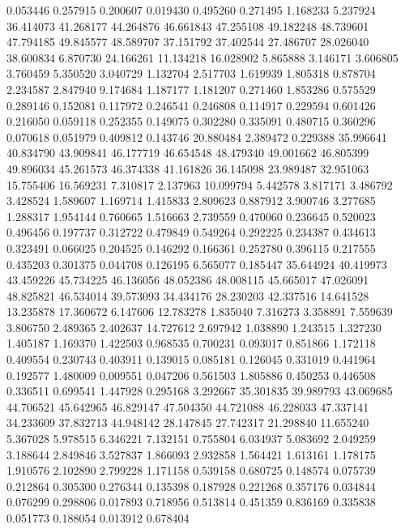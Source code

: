 0.053446
0.257915
0.200607
0.019430
0.495260
0.271495
1.168233
5.237924
36.414073
41.268177
44.264876
46.661843
47.255108
49.182248
48.739601
47.794185
49.845577
48.589707
37.151792
37.402544
27.486707
28.026040
38.600834
6.870730
24.166261
11.134218
16.028902
5.865888
3.146171
3.606805
3.760459
5.350520
3.040729
1.132704
2.517703
1.619939
1.805318
0.878704
2.234587
2.847940
9.174684
1.187177
1.181207
0.271460
1.853286
0.575529
0.289146
0.152081
0.117972
0.246541
0.246808
0.114917
0.229594
0.601426
0.216050
0.059118
0.252355
0.149075
0.302280
0.335091
0.480715
0.360296
0.070618
0.051979
0.409812
0.143746
20.880484
2.389472
0.229388
35.996641
40.834790
43.909841
46.177719
46.654548
48.479340
49.001662
46.805399
49.896034
45.261573
46.374338
41.161826
36.145098
23.989487
32.951063
15.755406
16.569231
7.310817
2.137963
10.099794
5.442578
3.817171
3.486792
3.428524
1.589607
1.169714
1.415833
2.809623
0.887912
3.900746
3.277685
1.288317
1.954144
0.760665
1.516663
2.739559
0.470060
0.236645
0.520023
0.496456
0.197737
0.312722
0.479849
0.549264
0.292225
0.234387
0.434613
0.323491
0.066025
0.204525
0.146292
0.166361
0.252780
0.396115
0.217555
0.435203
0.301375
0.044708
0.126195
6.565077
0.185447
35.644924
40.419973
43.459226
45.734225
46.136056
48.052386
48.008115
45.665017
47.026091
48.825821
46.534014
39.573093
34.434176
28.230203
42.337516
14.641528
13.235878
17.360672
6.147606
12.783278
1.835040
7.316273
3.358891
7.559639
3.806750
2.489365
2.402637
14.727612
2.697942
1.038890
1.243515
1.327230
1.405187
1.169370
1.422503
0.968535
0.700231
0.093017
0.851866
1.172118
0.409554
0.230743
0.403911
0.139015
0.085181
0.126045
0.331019
0.441964
0.192577
1.480009
0.009551
0.047206
0.561503
1.805886
0.450253
0.446508
0.336511
0.699541
1.447928
0.295168
3.292667
35.301835
39.989793
43.069685
44.706521
45.642965
46.829147
47.504350
44.721088
46.228033
47.337141
34.233609
37.832713
44.948142
28.147845
27.742317
21.298840
11.655240
5.367028
5.978515
6.346221
7.132151
0.755804
6.034937
5.083692
2.049259
3.188644
2.849846
3.527837
1.866093
2.932858
1.564421
1.613161
1.178175
1.910576
2.102890
2.799228
1.171158
0.539158
0.680725
0.148574
0.075739
0.212864
0.305300
0.276344
0.135398
0.187928
0.221268
0.357176
0.034844
0.076299
0.298806
0.017893
0.718956
0.513814
0.451359
0.836169
0.335838
0.051773
0.188054
0.013912
0.678404
